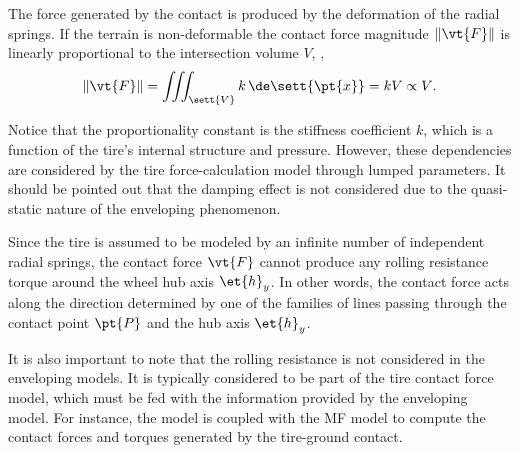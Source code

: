 \begin{observation}
  The force generated by the contact is produced by the deformation of the radial springs. If the terrain is non-deformable the contact force magnitude $\|\vt{F}\|$ is linearly proportional to the intersection volume $V$, \ie{},
  \begin{equation*}
    \| \vt{F} \| = \iiint_\sett{V} k \, \de\sett{\pt{x}} = k V \propto V \text{.}
  \end{equation*}
\end{observation}
%
Notice that the proportionality constant is the stiffness coefficient $k$, which is a function of the tire's internal structure and pressure. However, these dependencies are considered by the tire force-calculation model through lumped parameters. It should be pointed out that the damping effect is not considered due to the quasi-static nature of the enveloping phenomenon.
%
\begin{observation}
  Since the tire is assumed to be modeled by an infinite number of independent radial springs, the contact force $\vt{F}$ cannot produce any rolling resistance torque around the wheel hub axis $\et{h}_y$. In other words, the contact force acts along the direction determined by one of the families of lines passing through the contact point $\pt{P}$ and the hub axis $\et{h}_y$.
\end{observation}
%
It is also important to note that the rolling resistance is not considered in the enveloping models. It is typically considered to be part of the tire contact force model, which must be fed with the information provided by the enveloping model. For instance, the \Swift{} model is coupled with the \ac{MF} model to compute the contact forces and torques generated by the tire-ground contact.

